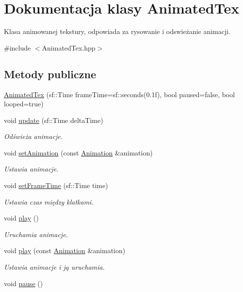\hypertarget{class_animated_tex}{\section{Dokumentacja klasy Animated\-Tex}
\label{class_animated_tex}
}


Klasa animowanej tekstury, odpowiada za rysowanie i odswieżanie animacji.  




{\ttfamily \#include $<$Animated\-Tex.\-hpp$>$}

\subsection*{Metody publiczne}
\begin{DoxyCompactItemize}
\item 
\hyperlink{class_animated_tex_aad27e7a75d924a41d6ce730b39a5988c}{Animated\-Tex} (sf\-::\-Time frame\-Time=sf\-::seconds(0.\-1f), bool paused=false, bool looped=true)
\item 
void \hyperlink{class_animated_tex_a85fef84459eabfa907232b82a0789bd5}{update} (sf\-::\-Time delta\-Time)
\begin{DoxyCompactList}\small\item\em Odświeża animacje. \end{DoxyCompactList}\item 
void \hyperlink{class_animated_tex_aaa4f26ecb114c606f56ba454214db018}{set\-Animation} (const \hyperlink{class_animation}{Animation} \&animation)
\begin{DoxyCompactList}\small\item\em Ustawia animacje. \end{DoxyCompactList}\item 
void \hyperlink{class_animated_tex_a25446e7f0029da5abb56a35281b8115a}{set\-Frame\-Time} (sf\-::\-Time time)
\begin{DoxyCompactList}\small\item\em Ustawia czas między klatkami. \end{DoxyCompactList}\item 
\hypertarget{class_animated_tex_a77af1f173095af0bd443740f59ac6550}{void \hyperlink{class_animated_tex_a77af1f173095af0bd443740f59ac6550}{play} ()}\label{class_animated_tex_a77af1f173095af0bd443740f59ac6550}

\begin{DoxyCompactList}\small\item\em Uruchamia animacje. \end{DoxyCompactList}\item 
void \hyperlink{class_animated_tex_a9445c85032a203894a3365f0d62ac19e}{play} (const \hyperlink{class_animation}{Animation} \&animation)
\begin{DoxyCompactList}\small\item\em Ustawia animacje i ją uruchamia. \end{DoxyCompactList}\item 
\hypertarget{class_animated_tex_a1217fc5e02d0fd5a2b4390aba66d2271}{void \hyperlink{class_animated_tex_a1217fc5e02d0fd5a2b4390aba66d2271}{pause} ()}\label{class_animated_tex_a1217fc5e02d0fd5a2b4390aba66d2271}


\end{DoxyCompactItemize}
